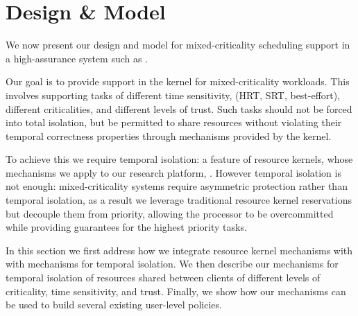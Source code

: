 \chapter{Design \& Model}
\label{chap:model}

We now present our design and model for mixed-criticality scheduling support in a high-assurance
system such as \selfour. 

Our goal is to provide support in the kernel for mixed-criticality workloads.  This involves
supporting tasks of different time sensitivity, (\gls{HRT}, \gls{SRT}, best-effort), different
criticalities, and different levels of trust.  Such tasks should not be forced into total
isolation, but be permitted to share resources without violating their temporal correctness
properties through mechanisms provided by the kernel.

To achieve this we require temporal isolation: a feature of resource kernels, whose mechanisms we
apply to our research platform, \selfour.  However temporal isolation is not enough: mixed-criticality
systems require asymmetric protection rather than temporal isolation, as a result we leverage
traditional resource kernel reservations but decouple them from priority, allowing the processor to
be overcommitted while providing guarantees for the highest priority tasks.

In this section we first address how we integrate resource kernel mechanisms with \selfour with
mechanisms for temporal isolation. We then describe our mechanisms for temporal isolation of
resources shared between clients of different levels of criticality, time sensitivity, and trust.
Finally, we show how our mechanisms can be used to build several existing user-level policies. 

